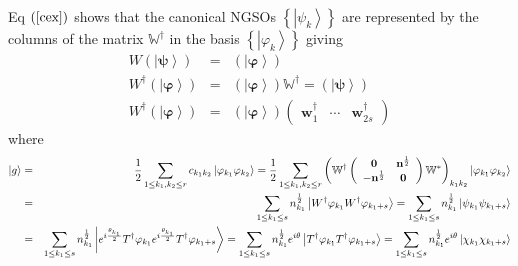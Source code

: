 \documentclass[aps,preprint]{revtex4}
\begin{document}
Eq $\left( \ref{cex}\right) $ shows that the canonical NGSOs $\left\{
\left\vert \psi _{k}\right\rangle \right\} $ are represented by the columns
of the matrix $\mathbb{W}^{\dagger }$ in the basis $\left\{ \left\vert
\varphi _{k}\right\rangle \right\} $ giving 
\begin{eqnarray}
W\left( \left\vert \mathbf{\psi }\right\rangle \right) &=&\left( \left\vert 
\mathbf{\varphi }\right\rangle \right)  \nonumber \\
W^{\dagger }\left( \left\vert \mathbf{\varphi }\right\rangle \right)
&=&\left( \left\vert \mathbf{\varphi }\right\rangle \right) \mathbb{W}%
^{\dagger }=\left( \left\vert \mathbf{\psi }\right\rangle \right)  \nonumber
\\
W^{\dagger }\left( \left\vert \mathbf{\varphi }\right\rangle \right)
&=&\left( \left\vert \mathbf{\varphi }\right\rangle \right) \left( 
\begin{array}{ccc}
\mathbf{w}_{1}^{\dagger } & \cdots & \mathbf{w}_{2s}^{\dagger }%
\end{array}%
\right)
\end{eqnarray}%
where 
\begin{eqnarray}
\left\vert g\right\rangle &=&\frac{1}{2}\sum_{1\leq k_{1},k_{2}\leq
r}c_{k_{1}k_{2}}\left\vert \varphi _{k_{1}}\varphi _{k_{2}}\right\rangle =%
\frac{1}{2}\sum_{1\leq k_{1},k_{2}\leq r}\left( \mathbb{W}^{\dagger }\left( 
\begin{array}{cc}
\mathbf{0} & \mathbf{n}^{\frac{1}{2}} \\ 
-\mathbf{n}^{\frac{1}{2}} & \mathbf{0}%
\end{array}%
\right) \mathbb{W}^{\ast }\right) _{k_{1}k_{2}}\left\vert \varphi
_{k_{1}}\varphi _{k_{2}}\right\rangle  \nonumber \\
&=&\sum_{1\leq k_{1}\leq s}n_{k_{1}}^{\frac{1}{2}}\left\vert W^{\dagger
}\varphi _{k_{1}}W^{\dagger }\varphi _{k_{1}+s}\right\rangle =\sum_{1\leq
k_{1}\leq s}n_{k_{1}}^{\frac{1}{2}}\left\vert \psi _{k_{1}}\psi
_{k_{1}+s}\right\rangle  \nonumber \\
&=&\sum_{1\leq k_{1}\leq s}n_{k_{1}}^{\frac{1}{2}}\left\vert e^{i\frac{%
\mathbf{\theta }_{k_{1}}}{2}}T^{\dagger }\varphi _{k_{1}}e^{i\frac{\mathbf{%
\theta }_{k_{1}}}{2}}T^{\dagger }\varphi _{k_{1}+s}\right\rangle
=\sum_{1\leq k_{1}\leq s}n_{k_{1}}^{\frac{1}{2}}e^{i\theta }\left\vert
T^{\dagger }\varphi _{k_{1}}T^{\dagger }\varphi _{k_{1}+s}\right\rangle
=\sum_{1\leq k_{1}\leq s}n_{k_{1}}^{\frac{1}{2}}e^{i\theta }\left\vert \chi
_{k_{1}}\chi _{k_{1}+s}\right\rangle
\end{eqnarray}%
\end{document}
